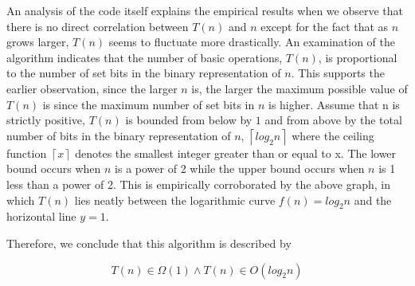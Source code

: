 \documentclass[12pt]{article}
\begin{document}
An analysis of the code itself explains the empirical results when we
observe that there is no direct correlation between $T(n)$ and $n$ except
for the fact that as $n$ grows larger, $T(n)$ seems to fluctuate
more drastically. An examination of the algorithm indicates that the number
of basic operations, $T(n)$, is proportional to the number of set bits in
the binary representation of $n$. This supports the earlier observation, 
since the larger $n$ is, the larger the maximum possible value of $T(n)$ 
is since the maximum number of set bits in $n$ is higher. Assume that n is 
strictly positive, $T(n)$ is bounded from below by $1$ and from above by 
the total number of bits in the binary representation of $n$, 
$\left \lceil {log_2n} \right \rceil$ where the ceiling function 
$\left \lceil {x} \right \rceil$ denotes the smallest integer greater than 
or equal to x. The lower bound occurs when $n$ is a power of 2 while the 
upper bound occurs when $n$ is 1 less than a power of 2. This is empirically 
corroborated by the above graph, in which $T(n)$ lies neatly between the 
logarithmic curve $f(n) = log_2n$ and the horizontal line $y = 1$.

Therefore, we conclude that this algorithm is described by

\[
T(n) \in \Omega( 1 ) \land T(n) \in O(log_2n)
\]
\end{document}
